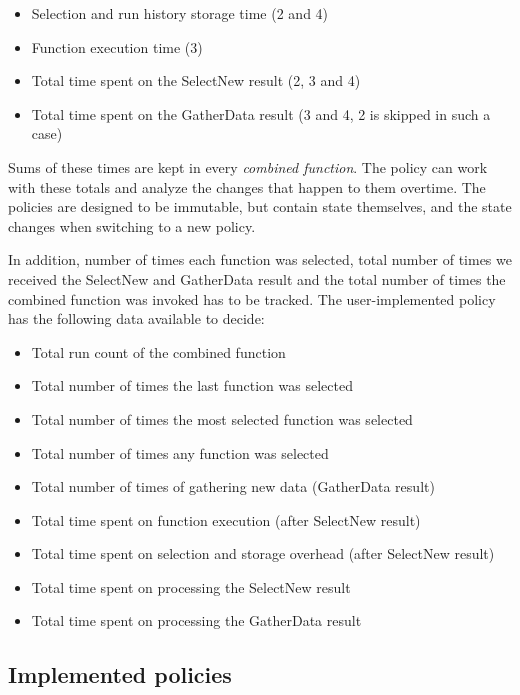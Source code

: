 \begin{itemize}
	\item Selection and run history storage time (2 and 4)
	\item Function execution time (3)
	\item Total time spent on the SelectNew result (2, 3 and 4)
	\item Total time spent on the GatherData result (3 and 4, 2 is skipped in such a case)
\end{itemize}

Sums of these times are kept in every \textit{combined function}. The policy can work with these totals and analyze the changes that happen to them overtime. The policies are designed to be immutable, but contain state themselves, and the state changes when switching to a new policy.

In addition, number of times each function was selected, total number of times we received the SelectNew and GatherData result and the total number of times the combined function was invoked has to be tracked. The user-implemented policy has the following data available to decide:

\begin{itemize}
	\item Total run count of the combined function
	\item Total number of times the last function was selected
	\item Total number of times the most selected function was selected
	\item Total number of times any function was selected
	\item Total number of times of gathering new data (GatherData result)
	\item Total time spent on function execution (after SelectNew result)
	\item Total time spent on selection and storage overhead (after SelectNew result)
	\item Total time spent on processing the SelectNew result
	\item Total time spent on processing the GatherData result
\end{itemize}

\subsection{Implemented policies}

